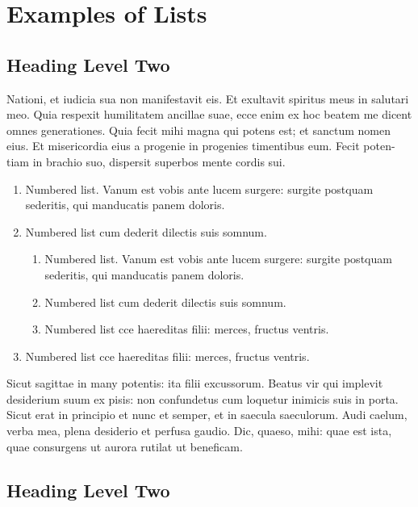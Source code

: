 \documentclass[pdftex,crc]{ios-book}
\begin{document}
\section{Examples of Lists}

\subsection{Heading Level Two}

Nationi, et iudicia sua non manifestavit eis. Et exultavit spiritus meus
in salutari meo.  Quia respexit humilitatem ancillae suae, ecce enim ex
hoc beatem me dicent omnes generationes. Quia fecit mihi magna qui potens
est; et sanctum nomen eius. Et misericordia eius a progenie in progenies
timentibus eum. Fecit poten-tiam in brachio suo, dispersit superbos mente
cordis sui.


\begin{enumerate}
\item Numbered list. Vanum est vobis ante lucem surgere: surgite
postquam sederitis, qui manducatis panem doloris.

\item Numbered list cum dederit dilectis suis somnum.

\begin{enumerate}
\item Numbered list. Vanum est vobis ante lucem surgere: surgite
postquam sederitis, qui manducatis panem doloris.

\item Numbered list cum dederit dilectis suis somnum.

\item Numbered list cce haereditas filii: merces, fructus ventris.
\end{enumerate}

\item Numbered list cce haereditas filii: merces, fructus ventris.
\end{enumerate}


Sicut sagittae in many potentis: ita filii excussorum. Beatus vir qui
implevit desiderium suum ex pisis: non confundetus cum loquetur inimicis
suis in porta.  Sicut erat in principio et nunc et semper, et in saecula
saeculorum. Audi caelum, verba mea, plena desiderio et perfusa gaudio.
Dic, quaeso, mihi: quae est ista, quae consurgens ut aurora rutilat ut
beneficam.


\subsection{Heading Level Two}
\end{document}
